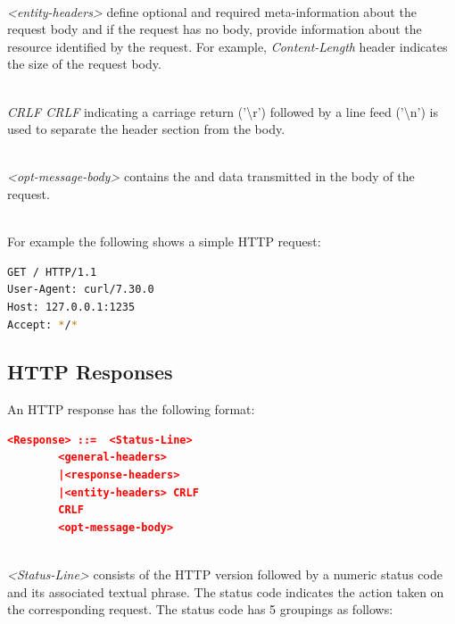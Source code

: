 \documentclass[a4paper,11pt,twoside]{article}
\begin{document}
\noindent\\
\textit{<entity-headers>} define optional and required meta-information about the request body and if the request has no body, provide information about the resource identified by the request. For example, \textit{Content-Length} header indicates the size of the request body. 

\noindent\\
\textit{CRLF CRLF} indicating a carriage return ('\textbackslash r') followed by a line feed ('\textbackslash n') is used to separate the header section from the body.

\noindent\\
\textit{<opt-message-body>} contains the and data transmitted in the body of the request.

\noindent\\
For example the following shows a simple HTTP request:

\begin{lstlisting}[language=bash,xleftmargin=.25in,xrightmargin=.25in]
GET / HTTP/1.1
User-Agent: curl/7.30.0
Host: 127.0.0.1:1235
Accept: */*
\end{lstlisting} 

\subsection{HTTP Responses}
An HTTP response has the following format:\\

\begin{lstlisting}[language=json]
<Response> ::=	<Status-Line>
		<general-headers>
		|<response-headers>
		|<entity-headers> CRLF
		CRLF 
		<opt-message-body>
\end{lstlisting} 
\noindent\\
\textit{<Status-Line>} consists of the HTTP version followed by a numeric status code and its associated textual phrase. The status code indicates the action taken on the corresponding request.  The status code has 5 groupings as follows:
\end{document}
